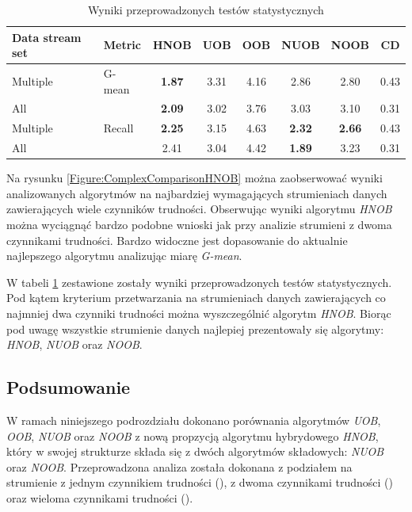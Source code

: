 \newpage

\begin{table}[ht]
\centering\small%
\setlength{\tabcolsep}{10pt} 
\renewcommand{\arraystretch}{1.5} 
\begin{tabular}{l l c c c c c c}
\toprule
Data stream set & Metric & HNOB & UOB & OOB & NUOB & NOOB & CD \\
\midrule
Multiple & G-mean & \textbf{1.87} & 3.31 & 4.16 & 2.86 & 2.80 & 0.43 \\
All  & & \textbf{2.09} & 3.02 & 3.76 & 3.03 & 3.10 & 0.31 \\
Multiple & Recall & \textbf{2.25} & 3.15 & 4.63 & \textbf{2.32} & \textbf{2.66} & 0.43\\
All  & & 2.41 & 3.04 & 4.42 & \textbf{1.89} & 3.23 & 0.31 \\
\bottomrule
\end{tabular}
\caption{Wyniki przeprowadzonych testów statystycznych}\label{Tab:ComplexFriedmanHNOB}
\end{table}

\noindent Na rysunku \ref{Figure:ComplexComparisonHNOB} można zaobserwować wyniki analizowanych algorytmów na najbardziej wymagających strumieniach danych zawierających wiele czynników trudności. Obserwując wyniki algorytmu \textit{HNOB} można wyciągnąć bardzo podobne wnioski jak przy analizie strumieni z dwoma czynnikami trudności. Bardzo widoczne jest dopasowanie do aktualnie najlepszego algorytmu analizując miarę \textit{G-mean}.

W tabeli \ref{Tab:ComplexFriedmanHNOB} zestawione zostały wyniki przeprowadzonych testów statystycznych. Pod kątem kryterium przetwarzania na strumieniach danych zawierających co najmniej dwa czynniki trudności można wyszczególnić algorytm \textit{HNOB}. Biorąc pod uwagę wszystkie strumienie danych najlepiej prezentowały się algorytmy: \textit{HNOB}, \textit{NUOB} oraz \textit{NOOB}.

\subsection{Podsumowanie}

\noindent W ramach niniejszego podrozdziału dokonano porównania algorytmów \textit{UOB}, \textit{OOB}, \textit{NUOB} oraz \textit{NOOB} z nową propzycją algorytmu hybrydowego \textit{HNOB}, który w swojej strukturze składa się z dwóch algorytmów składowych: \textit{NUOB} oraz \textit{NOOB}. Przeprowadzona analiza została dokonana z podziałem na strumienie z jednym czynnikiem trudności (), z dwoma czynnikami trudności () oraz wieloma czynnikami trudności ().


